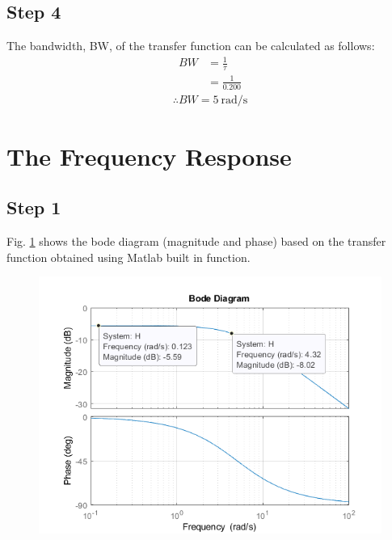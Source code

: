 \documentclass[hidelinks]{article}
\begin{document}
	\pagebreak
	\subsection{Step 4}	
	The bandwidth, BW, of the transfer function can be calculated as follows:
	\begin{align}
		\label{bw}
		BW &= \frac{1}{\tau}\\
		&= \frac{1}{0.200}\nonumber
	\end{align}
	\begin{align*}
		\therefore BW = \SI{5}{\radian/\second}
	\end{align*}
	\section{The Frequency Response}
	\subsection{Step 1}
	Fig. \ref{bd} shows the bode diagram (magnitude and phase) based on the transfer function obtained using Matlab built in function.
	\begin{figure}[htbp]
		\centering
		\includegraphics[width=0.7\textheight]{2_step1.png}
		\label{bd}
	\end{figure}

	\pagebreak
\end{document}
